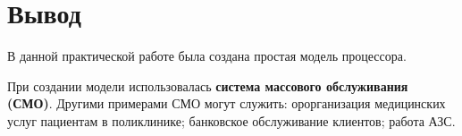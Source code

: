 \clearpage

\section*{\LARGE Вывод}
В данной практической работе была создана простая модель процессора.\par
При создании модели использовалась
\textbf{система массового обслуживания (СМО)}.
Другими примерами СМО могут служить:
орорганизация медицинских услуг пациентам в поликлинике;
банковское обслуживание клиентов; работа АЗС.
